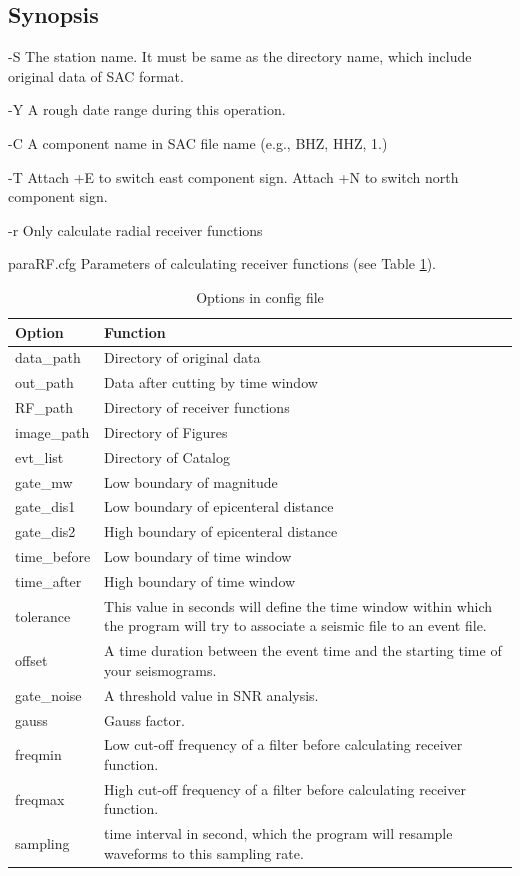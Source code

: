 \documentclass[12pt, a4paper]{report}
\begin{document}
\subsection{Synopsis}
\begin{description}
\item {\tb -S} The station name. It must be same as the directory name, which include original data of SAC format.
\item {\tb -Y} A rough date range during this operation.
\item {\tb -C} A component name in SAC file name (e.g., {\ti BHZ, HHZ, 1}.)
\item {\tb -T} Attach {\tb +E} to switch east component sign. Attach {\tb +N} to switch north component sign.
\item {\tb -r} Only calculate radial receiver functions
\item {\tb paraRF.cfg} Parameters of calculating receiver functions (see Table \ref{tab1}).
\begin{table}[h]
\caption{Options in config file}
\centering
\begin{tabular}{|p{}|m{}|} \toprule[1.5 pt]
Option & Function \\ \midrule[1 pt]
{\C data\_path} & Directory of original data\\
{\C out\_path} &  Data after cutting by time window\\
{\C RF\_path} & Directory of receiver functions\\
{\C image\_path} & Directory of Figures\\
{\C evt\_list} & Directory of Catalog\\ \midrule[1 pt]
{\C gate\_mw} & Low boundary of magnitude\\
{\C gate\_dis1} & Low boundary of epicenteral distance\\
{\C gate\_dis2} & High boundary of epicenteral distance\\
{\C time\_before} & Low boundary of time window\\
{\C time\_after} & High boundary of time window\\
{\C tolerance} & This value in seconds will define the time window within which the program will try to associate a seismic file to an event file.\\
{\C offset} & A time duration between the event time and the starting time of your seismograms.\\
{\C gate\_noise} & A threshold value in SNR analysis.\\
{\C gauss} & Gauss factor.\\
{\C freqmin} & Low cut-off frequency of a filter before calculating receiver function.\\
{\C freqmax} & High cut-off frequency of a filter before calculating receiver function.\\
{\C sampling} & time interval in second, which the program will resample waveforms to this sampling rate.\\
\bottomrule[1.5 pt]
\end{tabular}
\label{tab1}
\end{table}
\end{description}
\end{document}
